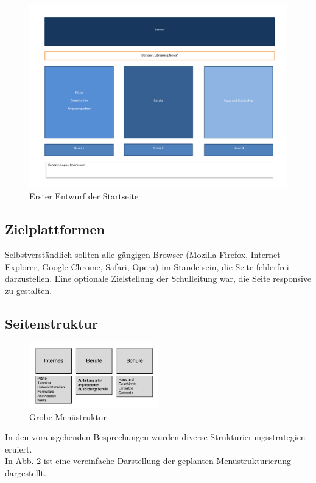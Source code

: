 \begin{figure}[ht]
	\centering
	\includegraphics[width=1\textwidth]{./Bilder/Idee_ISC_Startseite}
	\caption{Erster Entwurf der Startseite}
	\label{fig:Grobentwurf}
\end{figure}


\subsection{Zielplattformen}
\label{sec:Zielplattformen}
Selbstverst\"andlich sollten alle g\"angigen Browser (Mozilla Firefox, Internet Explorer, Google 
Chrome, Safari, Opera) im Stande sein, die Seite fehlerfrei darzustellen. Eine optionale 
Zielstellung der Schulleitung war, die Seite \acs{responsive} zu gestalten.

\subsection{Seitenstruktur}
\label{sec:Seitenstruktur}

\begin{figure}[ht]
	\includegraphics[width=0.50\textwidth]{./Bilder/Menuestruktur}
	\centering
	\caption{Grobe Men\"ustruktur}
	\label{fig:MS}
\end{figure}

 In den vorausgehenden Besprechungen wurden diverse Strukturierungsstrategien eruiert.\\
 In Abb. \ref{fig:MS} ist eine vereinfache Darstellung der geplanten
 Men\"ustrukturierung dargestellt.
